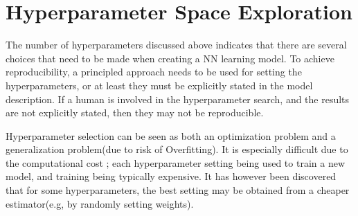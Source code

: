 \documentclass[twoside]{article}
\begin{document}
\section{Hyperparameter Space Exploration}

The number of hyperparameters discussed above indicates that there are several choices that need to be made when creating a NN learning model. To achieve reproducibility, a principled approach needs to be used for setting the hyperparameters, or at least they must be explicitly stated in the model description. If a human is involved in the hyperparameter search, and the results are not explicitly stated, then they may not be reproducible.

Hyperparameter selection can be seen as both an optimization problem and a generalization problem(due to risk of Overfitting). It is especially difficult due to the computational cost \cite{bengio2012practical}; each hyperparameter setting being used to train a new model, and training being typically expensive. It has however been discovered that for some hyperparameters, the best setting may be obtained from a cheaper estimator(e.g, by randomly setting weights).
\end{document}
